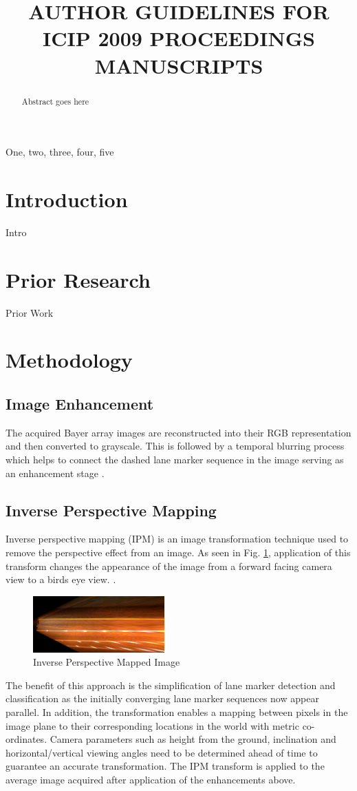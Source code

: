 \documentclass{article}
\title{AUTHOR GUIDELINES FOR ICIP 2009 PROCEEDINGS MANUSCRIPTS}
\begin{document}
%
\maketitle
%
\begin{abstract}
Abstract goes here
\end{abstract}
%
\begin{keywords}
One, two, three, four, five
\end{keywords}
%
\section{Introduction}
\label{sec:intro}
Intro

\section{Prior Research}
\label{sec:prior}
Prior Work

\section{Methodology}
\label{sec:methodology}

\subsection{Image Enhancement}
The acquired Bayer array images are reconstructed into their RGB representation and then converted to grayscale. This is followed by a temporal blurring process which helps to connect the dashed lane marker sequence in the image serving as an enhancement stage \cite{borkar_layered_2009}.
\subsection{Inverse Perspective Mapping}
Inverse perspective mapping (IPM) is an image transformation technique used to remove the perspective effect from an image. As seen in Fig. \ref{fig:ipm}, application of this transform changes the appearance of the image from a forward facing camera view to a birds eye view. \cite{sehestedt_robust_2007,shu_vision_2004,bertozzi_gold:parallel_1998}.
\begin{figure}[htb]
  \centering
  \includegraphics[width=0.45\textwidth]{IMG/ipm_fwd.png}
  \caption{Inverse Perspective Mapped Image}
  \label{fig:ipm}
\end{figure}
The benefit of this approach is the simplification of lane marker detection and classification as the initially converging lane marker sequences now appear parallel. In addition, the transformation enables a mapping between pixels in the image plane to their corresponding locations in the world with metric co-ordinates. Camera parameters such as height from the ground, inclination and horizontal/vertical viewing angles need to be determined ahead of time to guarantee an accurate transformation. The IPM transform is applied to the average image acquired after application of the enhancements above.
\end{document}
